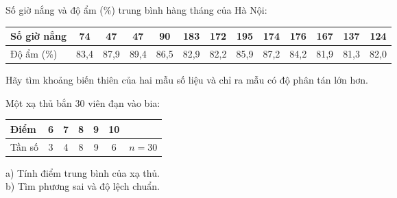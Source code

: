 \begin{bt}
	Số giờ nắng và độ ẩm (\%) trung bình hàng tháng của Hà Nội:
	\begin{center}
	\begin{tabular}{|l|c|c|c|c|c|c|c|c|c|c|c|c|}
		\hline
		Số giờ nắng & 74 & 47 & 47 & 90 & 183 & 172 & 195 & 174 & 176 & 167 & 137 & 124 \\
		\hline
		Độ ẩm (\%) & 83,4 & 87,9 & 89,4 & 86,5 & 82,9 & 82,2 & 85,9 & 87,2 & 84,2 & 81,9 & 81,3 & 82,0 \\
		\hline
	\end{tabular}
	\end{center}
	Hãy tìm khoảng biến thiên của hai mẫu số liệu và chỉ ra mẫu có độ phân tán lớn hơn.
\end{bt}

\begin{bt}
	Một xạ thủ bắn 30 viên đạn vào bia:
	\begin{center}
	\begin{tabular}{|l|c|c|c|c|c|c|}
		\hline
		Điểm & 6 & 7 & 8 & 9 & 10 & \\
		\hline
		Tần số & 3 & 4 & 8 & 9 & 6 & $n = 30$ \\
		\hline
	\end{tabular}
	\end{center}
	a) Tính điểm trung bình của xạ thủ.\\
	b) Tìm phương sai và độ lệch chuẩn.
\end{bt}

